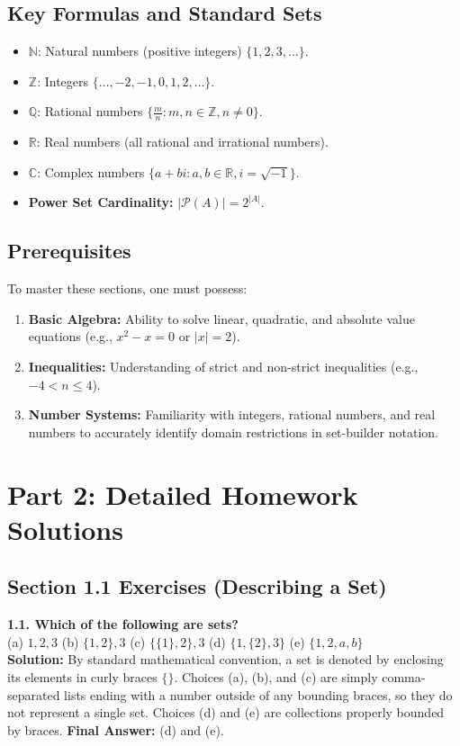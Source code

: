 \documentclass[12pt]{article}
\begin{document}
\subsection{Key Formulas and Standard Sets}
\begin{itemize}
    \item $\mathbb{N}$: Natural numbers (positive integers) $\{1, 2, 3, \dots\}$.
    \item $\mathbb{Z}$: Integers $\{\dots, -2, -1, 0, 1, 2, \dots\}$.
    \item $\mathbb{Q}$: Rational numbers $\{ \frac{m}{n} : m, n \in \mathbb{Z}, n \neq 0 \}$.
    \item $\mathbb{R}$: Real numbers (all rational and irrational numbers).
    \item $\mathbb{C}$: Complex numbers $\{a + bi : a, b \in \mathbb{R}, i = \sqrt{-1}\}$.
    \item \textbf{Power Set Cardinality:} $|\mathcal{P}(A)| = 2^{|A|}$.
\end{itemize}

\subsection{Prerequisites}
To master these sections, one must possess:
\begin{enumerate}
    \item \textbf{Basic Algebra:} Ability to solve linear, quadratic, and absolute value equations (e.g., $x^2 - x = 0$ or $|x| = 2$).
    \item \textbf{Inequalities:} Understanding of strict and non-strict inequalities (e.g., $-4 < n \le 4$).
    \item \textbf{Number Systems:} Familiarity with integers, rational numbers, and real numbers to accurately identify domain restrictions in set-builder notation.
\end{enumerate}

\newpage
\section{Part 2: Detailed Homework Solutions}

\subsection{Section 1.1 Exercises (Describing a Set)}

\textbf{1.1. Which of the following are sets?} \\
(a) $1, 2, 3$ \quad (b) $\{1, 2\}, 3$ \quad (c) $\{\{1\}, 2\}, 3$ \quad (d) $\{1, \{2\}, 3\}$ \quad (e) $\{1, 2, a, b\}$ \\
\textbf{Solution:} By standard mathematical convention, a set is denoted by enclosing its elements in curly braces $\{\}$. 
Choices (a), (b), and (c) are simply comma-separated lists ending with a number outside of any bounding braces, so they do not represent a single set. 
Choices (d) and (e) are collections properly bounded by braces.
\textbf{Final Answer:} (d) and (e).
\end{document}
